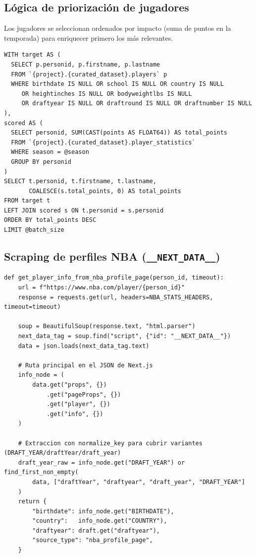 \documentclass[12pt, letterpaper]{article}
\begin{document}
\subsection{Lógica de priorización de jugadores}

Los jugadores se seleccionan ordenados por impacto (suma de puntos en la temporada) para enriquecer primero los más relevantes.

\begin{lstlisting}[style=codestyle, caption={Query BigQuery para obtener jugadores con nulos ordenados por impacto}]
WITH target AS (
  SELECT p.personid, p.firstname, p.lastname
  FROM `{project}.{curated_dataset}.players` p
  WHERE birthdate IS NULL OR school IS NULL OR country IS NULL
     OR heightinches IS NULL OR bodyweightlbs IS NULL
     OR draftyear IS NULL OR draftround IS NULL OR draftnumber IS NULL
),
scored AS (
  SELECT personid, SUM(CAST(points AS FLOAT64)) AS total_points
  FROM `{project}.{curated_dataset}.player_statistics`
  WHERE season = @season
  GROUP BY personid
)
SELECT t.personid, t.firstname, t.lastname,
       COALESCE(s.total_points, 0) AS total_points
FROM target t
LEFT JOIN scored s ON t.personid = s.personid
ORDER BY total_points DESC
LIMIT @batch_size
\end{lstlisting}

\subsection{Scraping de perfiles NBA (\texttt{\_\_NEXT\_DATA\_\_})}

\begin{lstlisting}[style=codestyle, caption={Extracción de datos del JSON embebido en la página de perfil del jugador}]
def get_player_info_from_nba_profile_page(person_id, timeout):
    url = f"https://www.nba.com/player/{person_id}"
    response = requests.get(url, headers=NBA_STATS_HEADERS, timeout=timeout)

    soup = BeautifulSoup(response.text, "html.parser")
    next_data_tag = soup.find("script", {"id": "__NEXT_DATA__"})
    data = json.loads(next_data_tag.text)

    # Ruta principal en el JSON de Next.js
    info_node = (
        data.get("props", {})
            .get("pageProps", {})
            .get("player", {})
            .get("info", {})
    )

    # Extraccion con normalize_key para cubrir variantes (DRAFT_YEAR/draftYear/draft_year)
    draft_year_raw = info_node.get("DRAFT_YEAR") or find_first_non_empty(
        data, ["draftYear", "draftyear", "draft_year", "DRAFT_YEAR"]
    )
    return {
        "birthdate": info_node.get("BIRTHDATE"),
        "country":   info_node.get("COUNTRY"),
        "draftyear": draft.get("draftyear"),
        "source_type": "nba_profile_page",
    }
\end{lstlisting}
\end{document}
